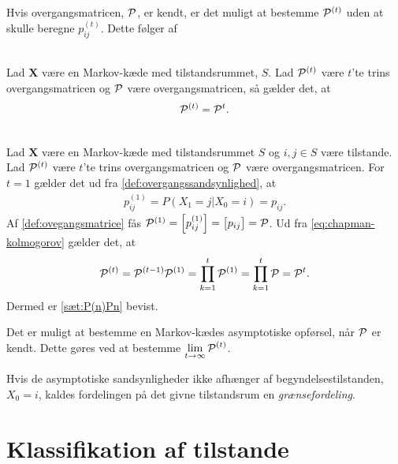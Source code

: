 Hvis overgangsmatricen, $\P$, er kendt, er det muligt at bestemme $\P^{(t)}$ uden at skulle beregne $p_{ij}^{(t)}$. Dette følger af 


\begin{minipage}\textwidth
\begin{thmx}\textbf{} \label{sæt:P(n)Pn} \\
Lad $\bm X$ være en Markov-kæde med tilstandsrummet, $S$. Lad $\P^{(t)}$ være $t$'te trins overgangsmatricen og $\P$ være overgangsmatricen, så gælder det, at
    \begin{align*}
        \P^{(t)} = \P^t.
    \end{align*}
\end{thmx}
\end{minipage}

\begin{bev}\textbf{}\\
Lad $\bm X$ være en Markov-kæde med tilstandsrummet $S$ og $i,j\in S$ være tilstande. Lad $\P^{(t)}$ være $t$'te trins overgangsmatricen og $\P$ være overgangsmatricen. For $t=1$ gælder det ud fra \autoref{def:overgangssandsynlighed}, at
\begin{align*}
    p_{ij}^{(1)} = P(X_1=j|X_0=i) = p_{ij}.
\end{align*}
Af \autoref{def:ovegangsmatrice} fås $\P^{(1)} = \left[p_{ij}^{(1)}\right] = \left[p_{ij}\right]= \P$. Ud fra \eqref{eq:chapman-kolmogorov} gælder det, at
\begin{align*}
    \P^{(t)}= \P^{(t-1)}\P^{(1)}=\prod_{k=1}^{t} \P^{(1)} = %
    \prod_{k=1}^{t} \P = \P^{t}.
\end{align*}
Dermed er \autoref{sæt:P(n)Pn} bevist.
\end{bev}

Det er muligt at bestemme en Markov-kædes asymptotiske opførsel, når $\P$ er kendt. Dette gøres ved at bestemme $\displaystyle \lim_{t \to \infty} \P^{(t)}$.

Hvis de asymptotiske sandsynligheder ikke afhænger af begyndelsestilstanden, $X_0=i$, kaldes fordelingen på det givne tilstandsrum en \textit{grænsefordeling}.


\section{Klassifikation af tilstande}

